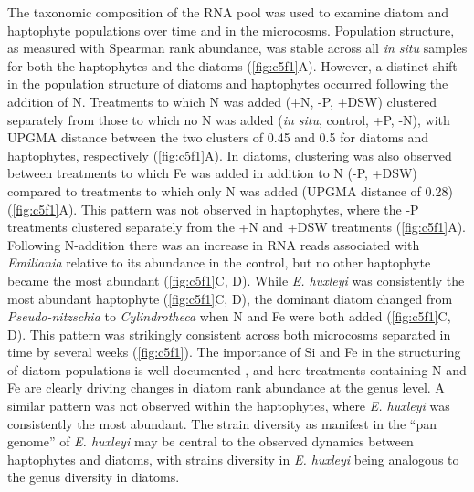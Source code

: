 The taxonomic composition of the RNA pool was used to examine diatom and haptophyte populations over time and in the microcosms. Population structure, as measured with Spearman rank abundance, was stable across all \textit{in situ} samples for both the haptophytes and the diatoms (\cref{fig:c5f1}A). However, a distinct shift in the population structure of diatoms and haptophytes occurred following the addition of N. Treatments to which N was added (+N, -P, +DSW) clustered separately from those to which no N was added (\textit{in situ}, control, +P, -N), with UPGMA distance between the two clusters of 0.45 and 0.5 for diatoms and haptophytes, respectively (\cref{fig:c5f1}A). In diatoms, clustering was also observed between treatments to which Fe was added in addition to N (-P, +DSW) compared to treatments to which only N was added (UPGMA distance of 0.28) (\cref{fig:c5f1}A). This pattern was not observed in haptophytes, where the -P treatments clustered separately from the +N and +DSW treatments (\cref{fig:c5f1}A). Following N-addition there was an increase in RNA reads associated with \textit{Emiliania} relative to its abundance in the control, but no other haptophyte became the most abundant (\cref{fig:c5f1}C, D). While \textit{E. huxleyi} was consistently the most abundant haptophyte (\cref{fig:c5f1}C, D), the dominant diatom changed from \textit{Pseudo-nitzschia} to \textit{Cylindrotheca} when N and Fe were both added (\cref{fig:c5f1}C, D). This pattern was strikingly consistent across both microcosms separated in time by several weeks (\cref{fig:c5f1}). The importance of Si and Fe in the structuring of diatom populations is well-documented \citep{Marchetti2005, Marchetti2012a}, and here treatments containing N and Fe are clearly driving changes in diatom rank abundance at the genus level. A similar pattern was not observed within the haptophytes, where \textit{E. huxleyi} was consistently the most abundant. The strain diversity as manifest in the ``pan genome'' of \textit{E. huxleyi} \citep{Read2013} may be central to the observed dynamics between haptophytes and diatoms, with strains diversity in \textit{E. huxleyi} being analogous to the genus diversity in diatoms.\par

